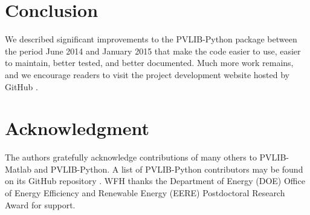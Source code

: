 \documentclass[conference]{IEEEtran}
\begin{document}
\section{Conclusion}
We described significant improvements to the PVLIB-Python package between the period June 2014 and January 2015 that make the code easier to use, easier to maintain, better tested, and better documented. 
Much more work remains, and we encourage readers to visit the project development website hosted by GitHub \cite{pvlib-github}.


\section*{Acknowledgment}
The authors gratefully acknowledge contributions of many others to PVLIB-Matlab and PVLIB-Python. A list of PVLIB-Python contributors may be found on its GitHub repository \cite{pvlib-github}. WFH thanks the Department of Energy (DOE) Office of Energy Efficiency and Renewable Energy (EERE) Postdoctoral Research Award for support. 

\vfil\eject







\end{document}
